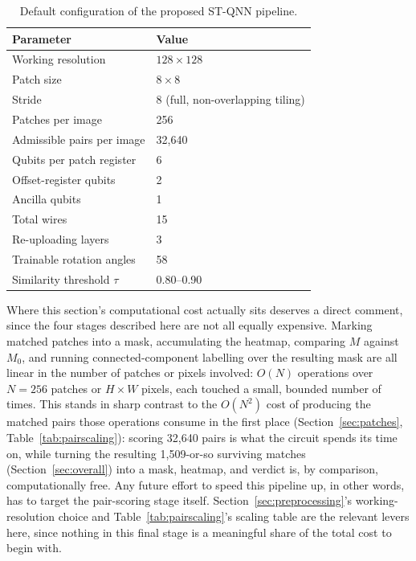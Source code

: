 \documentclass[conference]{IEEEtran}
\begin{document}
\begin{table}[t]
\centering
\caption{Default configuration of the proposed ST-QNN pipeline.}
\label{tab:config}
\begin{tabular}{ll}
\toprule
\textbf{Parameter} & \textbf{Value}\\
\midrule
Working resolution & $128\times128$\\
Patch size & $8\times8$\\
Stride & 8 (full, non-overlapping tiling)\\
Patches per image & 256\\
Admissible pairs per image & 32,640\\
Qubits per patch register & 6\\
Offset-register qubits & 2\\
Ancilla qubits & 1\\
Total wires & 15\\
Re-uploading layers & 3\\
Trainable rotation angles & 58\\
Similarity threshold $\tau$ & 0.80--0.90\\
\bottomrule
\end{tabular}
\end{table}

Where this section's computational cost actually sits deserves a direct comment, since the four stages described here are not all equally expensive. Marking matched patches into a mask, accumulating the heatmap, comparing $M$ against $M_0$, and running connected-component labelling over the resulting mask are all linear in the number of patches or pixels involved: $O(N)$ operations over $N = 256$ patches or $H\times W$ pixels, each touched a small, bounded number of times. This stands in sharp contrast to the $O(N^2)$ cost of producing the matched pairs those operations consume in the first place (Section~\ref{sec:patches}, Table~\ref{tab:pairscaling}): scoring 32,640 pairs is what the circuit spends its time on, while turning the resulting 1,509-or-so surviving matches (Section~\ref{sec:overall}) into a mask, heatmap, and verdict is, by comparison, computationally free. Any future effort to speed this pipeline up, in other words, has to target the pair-scoring stage itself. Section~\ref{sec:preprocessing}'s working-resolution choice and Table~\ref{tab:pairscaling}'s scaling table are the relevant levers here, since nothing in this final stage is a meaningful share of the total cost to begin with.

\end{document}
